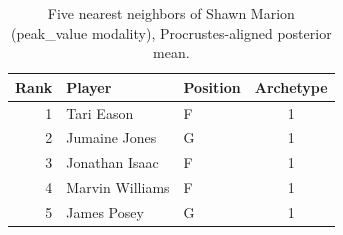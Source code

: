 \begin{table}[htbp]
  \centering\small
  \begin{tabular}{rllc}
    \toprule
    Rank & Player & Position & Archetype \\
    \midrule
    1 & Tari Eason & F & 1 \\
    2 & Jumaine Jones & G & 1 \\
    3 & Jonathan Isaac & F & 1 \\
    4 & Marvin Williams & F & 1 \\
    5 & James Posey & G & 1 \\
    \bottomrule
  \end{tabular}
  \caption{Five nearest neighbors of Shawn Marion (peak_value modality), Procrustes-aligned posterior mean.}
  \label{tab:Shawn_Marion_neighbors_peak_value}
\end{table}

